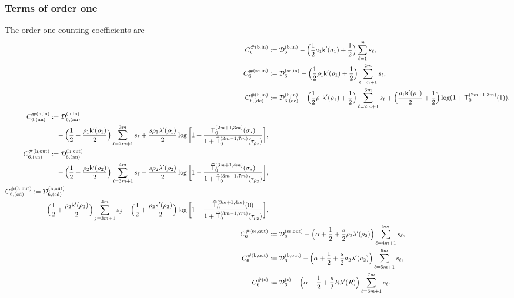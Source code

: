 \documentclass[a4paper]{article}
\numberwithin{equation}{section}
\begin{document}
\subsubsection{Terms of order one}
The order-one counting coefficients are
\begin{align}
C_6^{\#(\mathrm{b,in})}&:=
\mathcal{D}_6^{(\mathrm{b,in})}-\Bigl( 
\frac{1}{2}a_1\mathsf{k}'(a_1)+\frac{1}{2}
\Bigr)\sum_{\ell=1}^{m}s_{\ell},
\\
C_6^{\#(\mathrm{se,in})}&:=
\mathcal{D}_6^{(\mathrm{se,in})}
-
\Bigl(\frac{1}{2}\rho_1\mathsf{k}'(\rho_1)+\frac{1}{2}\Bigr)
\sum_{\ell=m+1}^{2m}s_{\ell},
\\
C_{6,(\mathrm{dc})}^{\#(\mathrm{h,in})}&:=    
\mathcal{D}_{6,(\mathrm{dc})}^{(\mathrm{h,in})}-\Bigl(\frac{1}{2}\rho_1\mathsf{k}'(\rho_1)+\frac{1}{2}\Bigr)
\sum_{\ell=2m+1}^{3m}s_{\ell}+\Bigl(\frac{\rho_1\mathsf{k}'(\rho_1)}{2}+\frac{1}{2}\Bigr)\log(1+\mathsf{T}_0^{(2m+1,3m)}(1)),
\\
\begin{split}
C_{6,(\mathrm{an})}^{\#(\mathrm{h,in})}&:=
\mathcal{D}_{6,(\mathrm{an})}^{(\mathrm{h,in})}
\\
&\quad
- 
\Bigl(\frac{1}{2}+\frac{\rho_1\mathsf{k}'(\rho_1)}{2}\Bigr)\sum_{\ell=2m+1}^{3m}s_{\ell}
+
\frac{s\rho_1\lambda'(\rho_1)}{2}
\log\bigg[1+\frac{\mathsf{T}_{0}^{(2m+1,3m)}(\sigma_{\star})}{1+\widehat{\mathsf{T}}_0^{(3m+1,7m)}(\tau_{\rho_2})}\bigg], 
\end{split}
\\
\begin{split}
C_{6,(\mathrm{an})}^{\#(\mathrm{h,out})}&:=
\mathcal{D}_{6,(\mathrm{an})}^{(\mathrm{h,out})}
\\
&\quad
-\Bigl(\frac{1}{2}+\frac{\rho_2\mathsf{k}'(\rho_2)}{2}\Bigr)\sum_{\ell=3m+1}^{4m}s_{\ell} 
-\frac{s\rho_2\lambda'(\rho_2)}{2}\log\bigg[1-\frac{\widehat{\mathsf{T}}_0^{(3m+1,4m)}(\sigma_{\star})}{1+\widehat{\mathsf{T}}_0^{(3m+1,7m)}(\tau_{\rho_2})}\bigg],
\end{split}
\\
\begin{split}
C_{6,(\mathrm{cd})}^{\#(\mathrm{h,out})}
&:=\mathcal{D}_{6,(\mathrm{cd})}^{(\mathrm{h,out})}
\\
&\quad
-\Bigl( \frac{1}{2}+\frac{\rho_2\mathsf{k}'(\rho_2)}{2}\Bigr)\sum_{j=3m+1}^{4m}s_j
-\Bigl( \frac{1}{2}+\frac{\rho_2\mathsf{k}'(\rho_2)}{2}\Bigr)\log\bigg[1-\frac{\widehat{\mathsf{T}}_0^{(3m+1,4m)}(0)}{1+\widehat{\mathsf{T}}_0^{(3m+1,7m)}(\tau_{\rho_2})}\bigg],
\end{split}
\\
C_{6}^{\#(\mathrm{se,out})}&:=
\mathcal{D}_6^{(\mathrm{se,out})}
-\Bigl(\alpha+\frac{1}{2}+\frac{s}{2}\rho_2\lambda'(\rho_2)\Bigr)\sum_{\ell=4m+1}^{5m}s_{\ell},
\\
C_{6}^{\#(\mathrm{b,out})}
&:=
\mathcal{D}_6^{(\mathrm{b,out})}
- 
\Bigl(\alpha+\frac{1}{2}+\frac{s}{2}a_2\lambda'(a_2)\Bigr)\sum_{\ell=5m+1}^{6m}s_{\ell},
\\
C_{6}^{\#(\mathrm{s})}
&:=
\mathcal{D}_6^{(\mathrm{s})}
-\Bigl(\alpha+\frac{1}{2}+\frac{s}{2}R\lambda'(R)\Bigr)\sum_{\ell=6m+1}^{7m}s_{\ell}.
\end{align}
\end{document}
